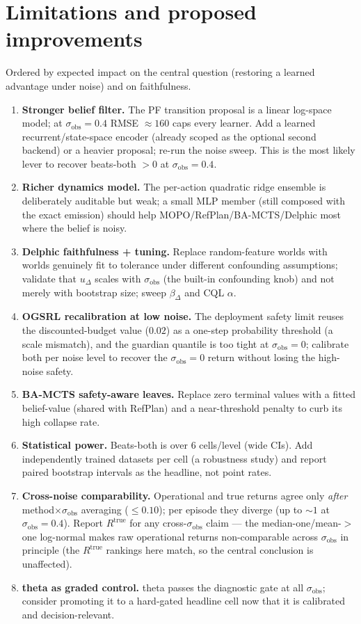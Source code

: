 \documentclass[11pt]{article}
\newcommand{\sobs}{\sigma_{\mathrm{obs}}}
\begin{document}
\section{Limitations and proposed improvements}
\label{sec:improve}
Ordered by expected impact on the central question (restoring a learned advantage
under noise) and on faithfulness.
\begin{enumerate}[leftmargin=1.6em]
\item \textbf{Stronger belief filter.} The PF transition proposal is a linear
log-space model; at $\sobs{=}0.4$ RMSE $\approx 160$ caps every learner. Add a
learned recurrent/state-space encoder (already scoped as the optional second
backend) or a heavier proposal; re-run the noise sweep. This is the most likely
lever to recover beats-both $>0$ at $\sobs{=}0.4$.
\item \textbf{Richer dynamics model.} The per-action quadratic ridge ensemble is
deliberately auditable but weak; a small MLP member (still composed with the exact
emission) should help MOPO/RefPlan/BA-MCTS/Delphic most where the belief is noisy.
\item \textbf{Delphic faithfulness + tuning.} Replace random-feature worlds with
worlds genuinely fit to tolerance under different confounding assumptions;
validate that $u_\Delta$ scales with $\sobs$ (the built-in confounding knob) and
not merely with bootstrap size; sweep $\beta_\Delta$ and CQL $\alpha$.
\item \textbf{OGSRL recalibration at low noise.} The deployment safety limit
reuses the discounted-budget value ($0.02$) as a one-step probability threshold (a
scale mismatch), and the guardian quantile is too tight at $\sobs{=}0$; calibrate
both per noise level to recover the $\sobs{=}0$ return without losing the
high-noise safety.
\item \textbf{BA-MCTS safety-aware leaves.} Replace zero terminal values with a
fitted belief-value (shared with RefPlan) and a near-threshold penalty to curb its
high collapse rate.
\item \textbf{Statistical power.} Beats-both is over $6$ cells/level (wide CIs).
Add independently trained datasets per cell (a robustness study) and report paired
bootstrap intervals as the headline, not point rates.
\item \textbf{Cross-noise comparability.} Operational and true returns agree only
\emph{after} method$\times\sobs$ averaging ($\le 0.10$); per episode they diverge
(up to $\sim 1$ at $\sobs{=}0.4$). Report $R^{\mathrm{true}}$ for any cross-$\sobs$
claim --- the median-one/mean-$>$one log-normal makes raw operational returns
non-comparable across $\sobs$ in principle (the $R^{\mathrm{true}}$ rankings here
match, so the central conclusion is unaffected).
\item \textbf{theta as graded control.} theta passes the diagnostic gate at all
$\sobs$; consider promoting it to a hard-gated headline cell now that it is
calibrated and decision-relevant.
\end{enumerate}
\end{document}
